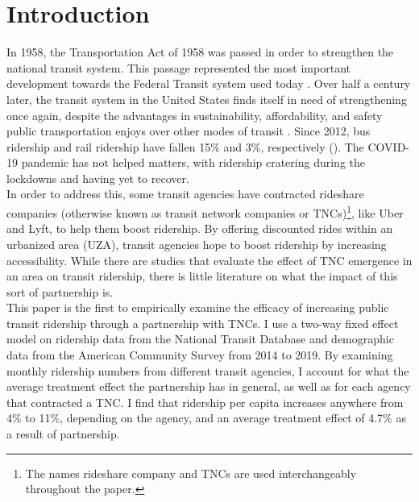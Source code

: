 \documentclass [12pt]{report}
\begin{document}
\section*{Introduction}


In 1958, the Transportation Act of 1958 was passed in order to strengthen the national transit system. This passage represented the most important development towards the Federal Transit system used today \parencite{ftaweb}. Over half a century later, the transit system in the United States finds itself in need of strengthening once again, despite the advantages in sustainability, affordability, and safety public transportation enjoys over other modes of transit \parencite{atpafact}. Since 2012, bus ridership and rail ridership have fallen 15\% and 3\%, respectively (\cite{erhardt22}). The COVID-19 pandemic has not helped matters, with ridership cratering during the lockdowns and having yet to recover. \\
\indent In order to address this, some transit agencies have contracted rideshare companies (otherwise known as transit network companies or TNCs)\footnote{The names rideshare company and TNCs are used interchangeably throughout the paper.}, like Uber and Lyft, to help them boost ridership. By offering discounted rides within an urbanized area (UZA), transit agencies hope to boost ridership by increasing accessibility. While there are studies that evaluate the effect of TNC emergence in an area on transit ridership, there is little literature on what the impact of this sort of partnership is.\\
\indent This paper is the first to empirically examine the efficacy of increasing public transit ridership through a partnership with
TNCs. I use a two-way fixed effect model on ridership data from the National Transit Database and demographic data from the American Community Survey from 2014 to 2019. By examining monthly ridership numbers from different transit agencies, I account for what the average treatment effect the partnership has in general, as well as for each agency that contracted a TNC. I find that ridership per capita increases anywhere from 4\% to 11\%, depending on the agency, and an average treatment effect of 4.7\% as a result of partnership.
\end{document}
